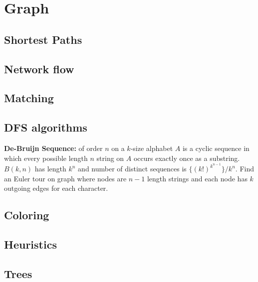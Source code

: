 \chapter{Graph}

\section{Shortest Paths}

\section{Network flow}

\section{Matching}

\section{DFS algorithms}
  \textbf{De-Bruijn Sequence:} of order $n$ on a $k$-size alphabet $A$ is a cyclic sequence in which every possible length $n$ string on $A$ occurs exactly once as a substring. $B(k, n)$ has length $k^n$ and number of distinct sequences is $\{(k!)^{k^{n - 1}}\}/k^n$. Find an Euler tour on graph where nodes are $n-1$ length strings and each node has $k$ outgoing edges for each character.


\section{Coloring}

\section{Heuristics}

\section{Trees}
